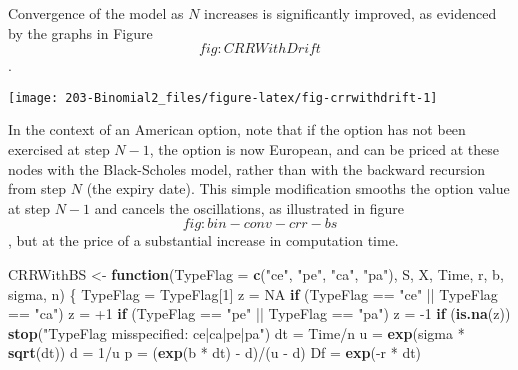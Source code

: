 \documentclass[justified]{tufte-book}
\newenvironment{Shaded}{}{}
\newcommand{\ControlFlowTok}[1]{\textcolor[rgb]{0.00,0.44,0.13}{\textbf{#1}}}
\newcommand{\DataTypeTok}[1]{\textcolor[rgb]{0.56,0.13,0.00}{#1}}
\newcommand{\DecValTok}[1]{\textcolor[rgb]{0.25,0.63,0.44}{#1}}
\newcommand{\KeywordTok}[1]{\textcolor[rgb]{0.00,0.44,0.13}{\textbf{#1}}}
\newcommand{\NormalTok}[1]{#1}
\newcommand{\OperatorTok}[1]{\textcolor[rgb]{0.40,0.40,0.40}{#1}}
\newcommand{\OtherTok}[1]{\textcolor[rgb]{0.00,0.44,0.13}{#1}}
\newcommand{\StringTok}[1]{\textcolor[rgb]{0.25,0.44,0.63}{#1}}
\begin{document}
Convergence of the model as \(N\) increases is significantly improved, as
evidenced by the graphs in Figure~\[fig:CRRWithDrift\].

\texttt{[image: 203-Binomial2\_files/figure-latex/fig-crrwithdrift-1]}

In the context of an American option, note that if the option has not
been exercised at step \(N-1\), the option is now European, and can be
priced at these nodes with the Black-Scholes model, rather than with the
backward recursion from step \(N\) (the expiry date). This simple
modification smooths the option value at step \(N-1\) and cancels the
oscillations, as illustrated in figure~\[fig:bin-conv-crr-bs\], but at
the price of a substantial increase in computation time.

\begin{Shaded}
\begin{Highlighting}[]
\NormalTok{CRRWithBS \textless{}{-}}\StringTok{ }\ControlFlowTok{function}\NormalTok{(}\DataTypeTok{TypeFlag =} \KeywordTok{c}\NormalTok{(}\StringTok{"ce"}\NormalTok{, }\StringTok{"pe"}\NormalTok{,}
    \StringTok{"ca"}\NormalTok{, }\StringTok{"pa"}\NormalTok{), S, X, Time, r, b, sigma, n) \{}
\NormalTok{    TypeFlag =}\StringTok{ }\NormalTok{TypeFlag[}\DecValTok{1}\NormalTok{]}
\NormalTok{    z =}\StringTok{ }\OtherTok{NA}
    \ControlFlowTok{if}\NormalTok{ (TypeFlag }\OperatorTok{==}\StringTok{ "ce"} \OperatorTok{||}\StringTok{ }\NormalTok{TypeFlag }\OperatorTok{==}\StringTok{ "ca"}\NormalTok{)}
\NormalTok{        z =}\StringTok{ }\OperatorTok{+}\DecValTok{1}
    \ControlFlowTok{if}\NormalTok{ (TypeFlag }\OperatorTok{==}\StringTok{ "pe"} \OperatorTok{||}\StringTok{ }\NormalTok{TypeFlag }\OperatorTok{==}\StringTok{ "pa"}\NormalTok{)}
\NormalTok{        z =}\StringTok{ }\DecValTok{{-}1}
    \ControlFlowTok{if}\NormalTok{ (}\KeywordTok{is.na}\NormalTok{(z))}
        \KeywordTok{stop}\NormalTok{(}\StringTok{"TypeFlag misspecified: ce|ca|pe|pa"}\NormalTok{)}
\NormalTok{    dt =}\StringTok{ }\NormalTok{Time}\OperatorTok{/}\NormalTok{n}
\NormalTok{    u =}\StringTok{ }\KeywordTok{exp}\NormalTok{(sigma }\OperatorTok{*}\StringTok{ }\KeywordTok{sqrt}\NormalTok{(dt))}
\NormalTok{    d =}\StringTok{ }\DecValTok{1}\OperatorTok{/}\NormalTok{u}
\NormalTok{    p =}\StringTok{ }\NormalTok{(}\KeywordTok{exp}\NormalTok{(b }\OperatorTok{*}\StringTok{ }\NormalTok{dt) }\OperatorTok{{-}}\StringTok{ }\NormalTok{d)}\OperatorTok{/}\NormalTok{(u }\OperatorTok{{-}}\StringTok{ }\NormalTok{d)}
\NormalTok{    Df =}\StringTok{ }\KeywordTok{exp}\NormalTok{(}\OperatorTok{{-}}\NormalTok{r }\OperatorTok{*}\StringTok{ }\NormalTok{dt)}


\end{Highlighting}
\end{Shaded}
\end{document}
